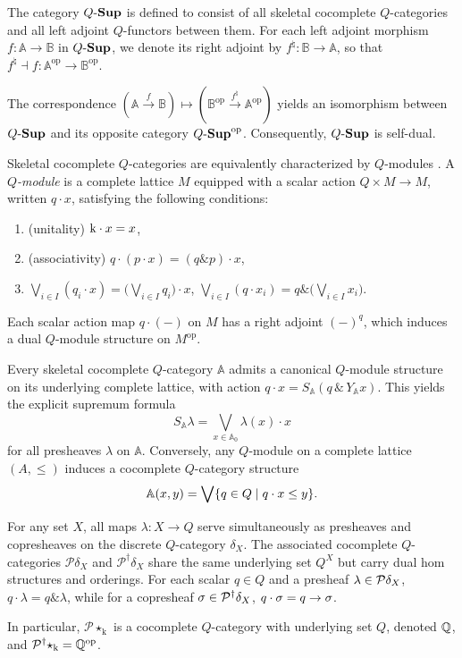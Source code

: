 \documentclass{tac}
\begin{document}
The category \({Q\text{-}\mathbf{Sup}}\) is defined to consist of all skeletal cocomplete \(Q\)-categories and all left adjoint \(Q\)-functors between them. For each left adjoint morphism \(f\colon\mathbb{A}\to\mathbb{B}\) in \({Q\text{-}\mathbf{Sup}}\), we denote its right adjoint by \(f^\natural\colon\mathbb{B}\to\mathbb{A}\), so that \(f^\natural\dashv f\colon\mathbb{A}^\mathrm{op}\to\mathbb{B}^\mathrm{op}\).

\begin{proposition}
The correspondence \((\mathbb{A}\xrightarrow{f}\mathbb{B})\mapsto(\mathbb{B}^\mathrm{op}\xrightarrow{f^\natural}\mathbb{A}^\mathrm{op})\) yields an isomorphism between \({Q\text{-}\mathbf{Sup}}\) and its opposite category \({Q\text{-}\mathbf{Sup}}^\mathrm{op}\). Consequently, \({Q\text{-}\mathbf{Sup}}\) is self-dual.
\end{proposition}

Skeletal cocomplete \(Q\)-categories are equivalently characterized by \(Q\)-modules \cite{JoyalTierney1984,Stubbe2007a}. A \emph{\(Q\)-module} is a complete lattice \(M\) equipped with a scalar action \(Q\times M\to M\), written \(q\cdot x\), satisfying the following conditions:
\begin{enumerate}[label=(\arabic*)]
\item (unitality) $\mathrm{k}\cdot x=x$, 
\item (associativity) $q\cdot(p\cdot x)=(q\& p)\cdot x$, 
\item $\bigvee_{i\in I}( q_i\cdot x)=\Big(\bigvee_{i\in I}q_i\Big)\cdot x$, $\bigvee_{i\in I} (q\cdot x_i)=q\&\Big(\bigvee_{i\in I}x_i\Big)$.
 \end{enumerate}
 Each scalar action map \(q\cdot(-)\) on \(M\) has a right adjoint \((-)^q\), which induces a dual \(Q\)-module structure on \(M^\mathrm{op}\).

Every skeletal cocomplete \(Q\)-category \(\mathbb{A}\) admits a canonical \(Q\)-module structure on its underlying complete lattice, with action \(q\cdot x=S_{\mathbb{A}}(q\,\&\,Y_{\mathbb{A}}x)\). This yields the explicit supremum formula
\begin{equation*}
S_{\mathbb{A}}\lambda=\bigvee_{x\in\mathbb{A}_0}\lambda(x)\cdot x
\end{equation*}
for all presheaves \(\lambda\) on \(\mathbb{A}\). Conversely, any \(Q\)-module on a complete lattice $(A,\leq)$ induces a cocomplete \(Q\)-category structure
$$\mathbb{A}(x,y)=\bigvee\{q\in Q\mid q\cdot x\leq y\}.$$ 
 

\begin{example} \label{ex:discrete}
For any set \(X\), all maps \(\lambda\colon X\to Q\) serve simultaneously as presheaves and copresheaves on the discrete \(Q\)-category \(\delta_X\). The associated cocomplete \(Q\)-categories \(\mathcal{P}\delta_X\) and \(\mathcal{P}^\dagger\delta_X\) share the same underlying set \(Q^X\) but carry dual hom structures and orderings.  For each scalar $q\in Q$ and a presheaf $\lambda\in\mathcal{P}\delta_X$, $q\cdot \lambda=q\&\lambda$, while for a copresheaf $\sigma\in\mathcal{P}^\dagger\delta_X$, $q\cdot\sigma=q\rightarrow\sigma$. 

In particular, \(\mathcal{P}\star_\mathrm{k}\) is a cocomplete \(Q\)-category with underlying set \(Q\), denoted \(\mathbb{Q}\), and \(\mathcal{P}^\dagger\star_\mathrm{k}=\mathbb{Q}^\mathrm{op}\).
\end{example}
\end{document}
